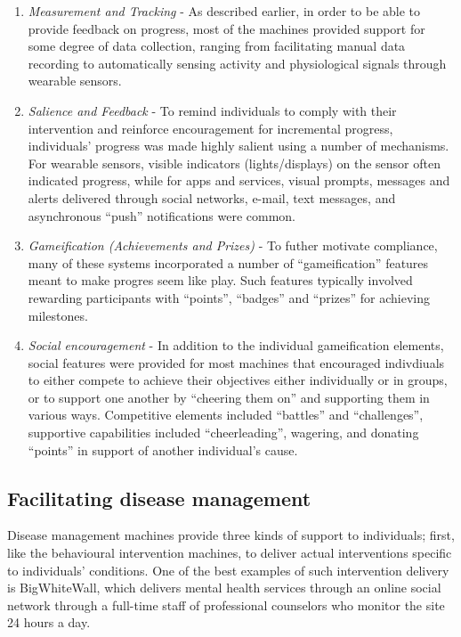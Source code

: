 \documentclass{sig-alternate}
\begin{document}
\begin{enumerate}
\item \emph{Measurement and Tracking} - As described earlier, in order
  to be able to provide feedback on progress, most of the machines
  provided support for some degree of data collection, ranging from
  facilitating manual data recording to automatically sensing activity
  and physiological signals through wearable sensors.
\item \emph{Salience and Feedback} - To remind individuals to comply
  with their intervention and reinforce encouragement for incremental
  progress, individuals' progress was made highly salient using a
  number of mechanisms.  For wearable sensors, visible indicators
  (lights/displays) on the sensor often indicated progress, while for
  apps and services, visual prompts, messages and alerts delivered
  through social networks, e-mail, text messages, and asynchronous
  ``push'' notifications were common.
\item \emph{Gameification (Achievements and Prizes)} - To futher
  motivate compliance, many of these systems incorporated a number of
  ``gameification'' features \cite{gameification} meant to make
  progres seem like play.  Such features typically involved rewarding
  participants with ``points'', ``badges'' and ``prizes'' for
  achieving milestones.
\item \emph{Social encouragement} - In addition to the individual
  gameification elements, social features were provided for most
  machines that encouraged indivdiuals to either compete to achieve
  their objectives either individually or in groups, or to support one
  another by ``cheering them on'' and supporting them in various ways.
  Competitive elements included ``battles'' and ``challenges'', supportive
  capabilities included ``cheerleading'', wagering, and donating ``points''
  in support of another individual's cause.
\end{enumerate}

\subsection{Facilitating disease management}
Disease management machines provide three kinds of support to
individuals; first, like the behavioural intervention machines, to
deliver actual interventions specific to individuals' conditions.  One
of the best examples of such intervention delivery is BigWhiteWall,
which delivers mental health services through an online social network
through a full-time staff of professional counselors who monitor the
site 24 hours a day.
\end{document}
